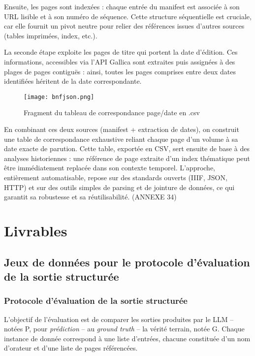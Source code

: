 Ensuite, les pages sont indexées : chaque entrée du manifest est associée à son URL lisible et à son numéro de séquence. Cette structure séquentielle est cruciale, car elle fournit un pivot neutre pour relier des références issues d’autres sources (tables imprimées, index, etc.).

La seconde étape exploite les pages de titre qui portent la date d’édition. Ces informations, accessibles via l’API Gallica sont extraites puis assignées à des plages de pages contiguës : ainsi, toutes les pages comprises entre deux dates identifiées héritent de la date correspondante.

\begin{figure}[htbp]
\centering
\texttt{[image: bnfjson.png]}
\caption{Fragment du tableau de correspondance page/date en .csv}
\label{fig:bnfjson}
\end{figure}

En combinant ces deux sources (manifest + extraction de dates), on construit une table de correspondance exhaustive reliant chaque page d’un volume à sa date exacte de parution. Cette table, exportée en CSV, sert ensuite de base à des analyses historiennes : une référence de page extraite d’un index thématique peut être immédiatement replacée dans son contexte temporel. L’approche, entièrement automatisable, repose sur des standards ouverts (IIIF, JSON, HTTP) et sur des outils simples de parsing et de jointure de données, ce qui garantit sa robustesse et sa réutilisabilité. (ANNEXE 34)

\chapter{Livrables}

\section{Jeux de données pour le protocole d'évaluation de la sortie structurée}

\subsection{Protocole d’évaluation de la sortie structurée}

L’objectif de l’évaluation est de comparer les sorties produites par le LLM -- notées P, pour \emph{prédiction} -- au \emph{ground truth} -- la vérité terrain, notée G. Chaque instance de donnée correspond à une liste d’entrées, chacune constituée d’un nom d’orateur et d’une liste de pages référencées.

